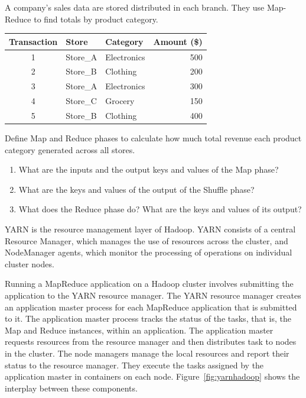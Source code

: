 \begin{exerciseboxpaper}
A company's sales data are stored distributed in each branch. They use Map-Reduce to find totals by product category.

\bigskip
\renewcommand{\arraystretch}{1.25}
\begin{tabular}{|c|l|l|r|}
\hline
\textbf{Transaction} & \textbf{Store} & \textbf{Category} & \textbf{Amount (\$)} \\
\hline
1 & Store\_A & Electronics & 500 \\
2 & Store\_B & Clothing    & 200 \\
3 & Store\_A & Electronics & 300 \\
4 & Store\_C & Grocery     & 150 \\
5 & Store\_B & Clothing    & 400 \\
\hline
\end{tabular}

\vspace{.5\baselineskip}

Define Map and Reduce phases to calculate how much total revenue each product category generated across all stores. 

\vspace{.5\baselineskip}

\begin{enumerate}
   \item What are the inputs and the output keys and values of the Map phase? 
   \item What are the keys and values of the output of the Shuffle phase?
   \item What does the Reduce phase do? What are the keys and values of its output?
\end{enumerate}
\end{exerciseboxpaper}

YARN is the resource management layer of Hadoop. YARN consists of a central Resource Manager, which manages the use of resources across the cluster, and NodeManager agents, which monitor the processing of operations on individual cluster nodes. 

Running a MapReduce application on a Hadoop cluster involves submitting the application to the YARN resource manager. The YARN resource manager creates an application master process for each MapReduce application that is submitted to it. The application master process tracks the status of the tasks, that is, the Map and Reduce instances, within an application. The application master requests resources from the resource manager and then distributes task to nodes in the cluster. The node managers manage the local resources and report their status to the resource manager. They execute the tasks assigned by the application master in containers on each node. Figure~\ref{fig:yarnhadoop} shows the interplay between these components.

